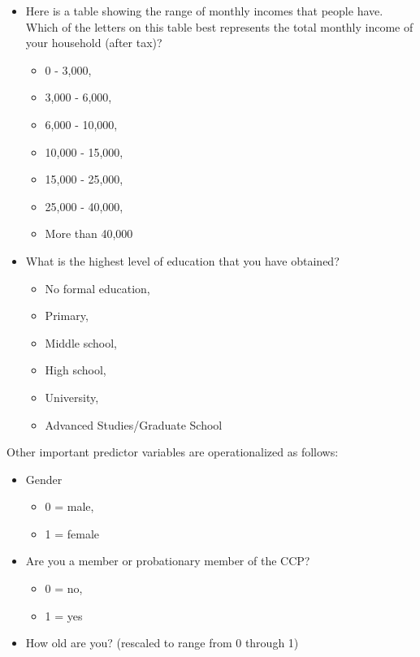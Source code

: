 \documentclass[
  letterpaper,
  DIV=11,
  numbers=noendperiod]{scrartcl}
\begin{document}
\begin{itemize}
\item
  Here is a table showing the range of monthly incomes that people have.
  Which of the letters on this table best represents the total monthly
  income of your household (after tax)?

  \begin{itemize}
  \item
    0 - 3,000,
  \item
    3,000 - 6,000,
  \item
    6,000 - 10,000,
  \item
    10,000 - 15,000,
  \item
    15,000 - 25,000,
  \item
    25,000 - 40,000,
  \item
    More than 40,000
  \end{itemize}
\item
  What is the highest level of education that you have obtained?

  \begin{itemize}
  \item
    No formal education,
  \item
    Primary,
  \item
    Middle school,
  \item
    High school,
  \item
    University,
  \item
    Advanced Studies/Graduate School
  \end{itemize}
\end{itemize}

Other important predictor variables are operationalized as follows:

\begin{itemize}
\item
  Gender

  \begin{itemize}
  \item
    0 = male,
  \item
    1 = female
  \end{itemize}
\item
  Are you a member or probationary member of the CCP?

  \begin{itemize}
  \item
    0 = no,
  \item
    1 = yes
  \end{itemize}
\item
  How old are you? (rescaled to range from 0 through 1)
\end{itemize}
\end{document}
